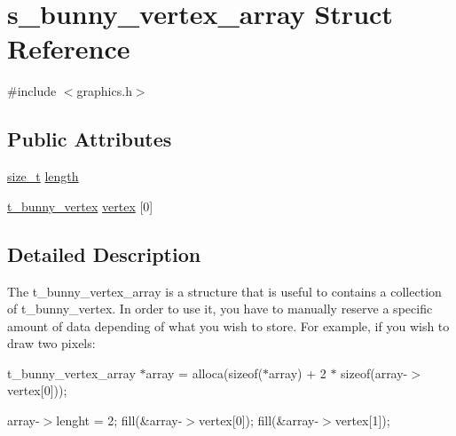 \hypertarget{structs__bunny__vertex__array}{\section{s\-\_\-bunny\-\_\-vertex\-\_\-array Struct Reference}
\label{structs__bunny__vertex__array}
}


{\ttfamily \#include $<$graphics.\-h$>$}

\subsection*{Public Attributes}
\begin{DoxyCompactItemize}
\item 
\hyperlink{nc__alloc_8h_a7b60c5629e55e8ec87a4547dd4abced4}{size\-\_\-t} \hyperlink{structs__bunny__vertex__array_ac9aececfcb6b5d75089ddcaac5286c2b}{length}
\item 
\hyperlink{graphics_8h_af00166dd6e68ece1b8aedc2a68f24c34}{t\-\_\-bunny\-\_\-vertex} \hyperlink{structs__bunny__vertex__array_a6823a8c6591d86407701a66c03ea6907}{vertex} \mbox{[}0\mbox{]}
\end{DoxyCompactItemize}


\subsection{Detailed Description}
The t\-\_\-bunny\-\_\-vertex\-\_\-array is a structure that is useful to contains a collection of t\-\_\-bunny\-\_\-vertex. In order to use it, you have to manually reserve a specific amount of data depending of what you wish to store. For example, if you wish to draw two pixels\-:

t\-\_\-bunny\-\_\-vertex\-\_\-array $\ast$array = alloca(sizeof($\ast$array) + 2 $\ast$ sizeof(array-\/$>$vertex\mbox{[}0\mbox{]}));

array-\/$>$lenght = 2; fill(\&array-\/$>$vertex\mbox{[}0\mbox{]}); fill(\&array-\/$>$vertex\mbox{[}1\mbox{]}); 


